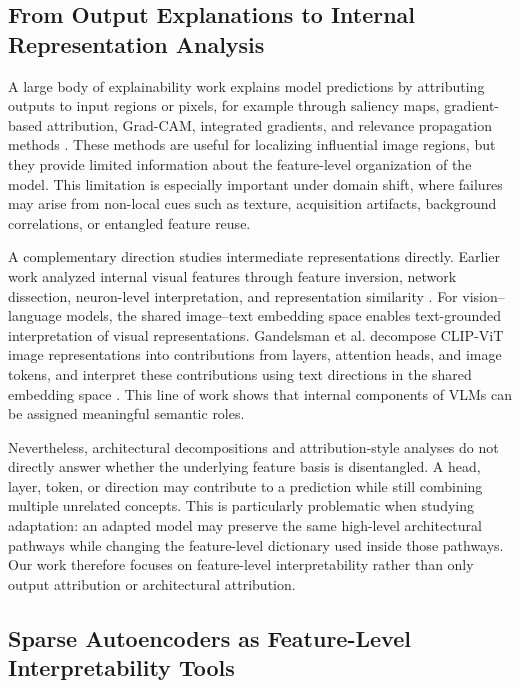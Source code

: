 \subsection{From Output Explanations to Internal Representation Analysis}

A large body of explainability work explains model predictions by attributing outputs to input regions or pixels, for example through saliency maps, gradient-based attribution, Grad-CAM, integrated gradients, and relevance propagation methods \citep{selvaraju2017grad, sundararajan2017axiomatic, bach2015pixel}. These methods are useful for localizing influential image regions, but they provide limited information about the feature-level organization of the model. This limitation is especially important under domain shift, where failures may arise from non-local cues such as texture, acquisition artifacts, background correlations, or entangled feature reuse.

A complementary direction studies intermediate representations directly. Earlier work analyzed internal visual features through feature inversion, network dissection, neuron-level interpretation, and representation similarity \citep{mahendran2014understanding, bau2017network, durrani2020analyzing, csiszarik2021similarity}. For vision--language models, the shared image--text embedding space enables text-grounded interpretation of visual representations. Gandelsman et al. decompose CLIP-ViT image representations into contributions from layers, attention heads, and image tokens, and interpret these contributions using text directions in the shared embedding space \citep{gandelsman2024interpreting}. This line of work shows that internal components of VLMs can be assigned meaningful semantic roles.

Nevertheless, architectural decompositions and attribution-style analyses do not directly answer whether the underlying feature basis is disentangled. A head, layer, token, or direction may contribute to a prediction while still combining multiple unrelated concepts. This is particularly problematic when studying adaptation: an adapted model may preserve the same high-level architectural pathways while changing the feature-level dictionary used inside those pathways. Our work therefore focuses on feature-level interpretability rather than only output attribution or architectural attribution.

\subsection{Sparse Autoencoders as Feature-Level Interpretability Tools}

